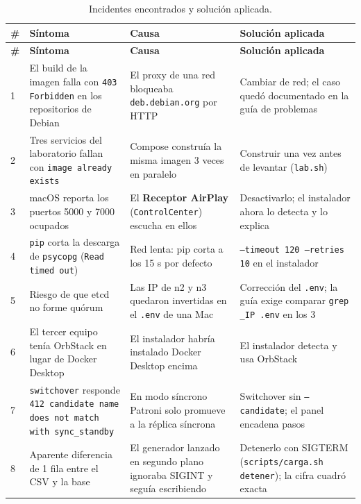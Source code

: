 \documentclass[11pt,a4paper]{article}
\newcommand{\cod}[1]{\texttt{#1}}
\begin{document}
\begin{longtable}{@{}L{0.4cm}L{4.3cm}L{4.4cm}L{5.2cm}@{}}
\caption{Incidentes encontrados y solución aplicada.}\\
\toprule
\textbf{\#} & \textbf{Síntoma} & \textbf{Causa} & \textbf{Solución aplicada} \\
\midrule
\endfirsthead
\toprule
\textbf{\#} & \textbf{Síntoma} & \textbf{Causa} & \textbf{Solución aplicada} \\
\midrule
\endhead
\bottomrule
\endfoot
\small 1 & \small El build de la imagen falla con \cod{403 Forbidden} en los repositorios de Debian & \small El proxy de una red bloqueaba \cod{deb.debian.org} por HTTP & \small Cambiar de red; el caso quedó documentado en la guía de problemas \\
\small 2 & \small Tres servicios del laboratorio fallan con \cod{image already exists} & \small Compose construía la misma imagen 3 veces en paralelo & \small Construir una vez antes de levantar (\cod{lab.sh}) \\
\small 3 & \small macOS reporta los puertos 5000 y 7000 ocupados & \small El \textbf{Receptor AirPlay} (\cod{ControlCenter}) escucha en ellos & \small Desactivarlo; el instalador ahora lo detecta y lo explica \\
\small 4 & \small \cod{pip} corta la descarga de \cod{psycopg} (\cod{Read timed out}) & \small Red lenta: pip corta a los 15 s por defecto & \small \cod{--timeout 120 --retries 10} en el instalador \\
\small 5 & \small Riesgo de que etcd no forme quórum & \small Las IP de n2 y n3 quedaron invertidas en el \cod{.env} de una Mac & \small Corrección del \cod{.env}; la guía exige comparar \cod{grep \_IP .env} en los 3 \\
\small 6 & \small El tercer equipo tenía OrbStack en lugar de Docker Desktop & \small El instalador habría instalado Docker Desktop encima & \small El instalador detecta y usa OrbStack \\
\small 7 & \small \cod{switchover} responde \cod{412 candidate name does not match with sync\_standby} & \small En modo síncrono Patroni solo promueve a la réplica síncrona & \small Switchover sin \cod{--candidate}; el panel encadena pasos \\
\small 8 & \small Aparente diferencia de 1 fila entre el CSV y la base & \small El generador lanzado en segundo plano ignoraba SIGINT y seguía escribiendo & \small Detenerlo con SIGTERM (\cod{scripts/carga.sh detener}); la cifra cuadró exacta \\

\end{longtable}
\end{document}
